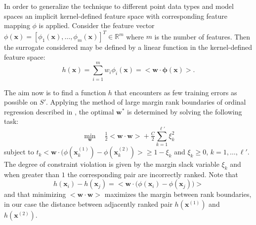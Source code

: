 \documentclass[conference]{IEEEtran}
\renewcommand{\vec}[1]{{\mbox{\boldmath$#1$}}}
\newcommand{\reals}{{\mathbb R}}
\newcommand{\inner}[2]{\big<\vec{#1}\cdot\vec{#2}\big>}
\renewcommand{\vec}[1]{{\mathbf #1}}
\begin{document}
In order to generalize the technique to different point data types and model spaces an implicit kernel-defined feature space with corresponding feature mapping $\phi$ is applied. Consider the feature vector $\phi(\vec{x})=[\phi_1(\vec{x}),\ldots,\phi_m(\vec{x})]^T\in
\reals^m$ where $m$ is the number of features. Then the surrogate considered may be defined by a linear function in the kernel-defined feature space:
\begin{equation}
h(\vec{x}) = \sum_{i=1}^m w_i\phi_i(\vec{x}) = \inner{w}{\phi(\vec{x})}.
\end{equation}

The aim now is to find a function $h$ that encounters as few training errors as possible on $S'$. Applying the method of large margin rank boundaries of ordinal regression described in \cite{Herbrich00}, the optimal $\vec{w}^*$ is determined by solving the following task:
\begin{equation} \min_{\vec{w}}\quad \tfrac{1}{2}\inner{w}{w} + \tfrac{C}{2}\sum_{k=1}^{\ell'}\xi_k^2 \label{eq:margin} \end{equation}
subject to $t_k\inner{w}{(\phi(\vec{x}_k^{(1)})-\phi(\vec{x}_k^{(2)})}\ge 1 - \xi_k$ and $\xi_k \ge 0$, $k = 1,\ldots, \ell'$. The degree of constraint violation is given by the margin slack variable $\xi_k$ and when greater than $1$ the corresponding pair are incorrectly ranked. Note that
\begin{equation} h(\vec{x}_i)-h(\vec{x}_j) = \inner{w}{(\phi(\vec{x}_i)-\phi(\vec{x}_j))} \end{equation}
and that minimizing $\inner{w}{w}$ maximizes the margin between rank boundaries, in our case the distance between adjacently ranked pair $h(\vec{x}^{(1)})$ and $h(\vec{x}^{(2)})$.
\end{document}
